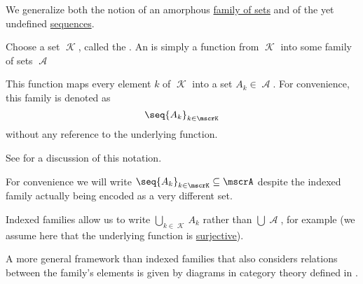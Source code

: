 \begin{definition}\label{def:indexed_family}
  We generalize both the notion of an amorphous \hyperref[rem:family_of_sets]{family of sets} and of the yet undefined \hyperref[def:sequence]{sequences}.

  Choose a set \( \mscrK \), called the . An  is simply a function from \( \mscrK \) into some family of sets \( \mscrA \)

  This function maps every element \( k \) of \( \mscrK \) into a set \( A_k \in \mscrA \). For convenience, this family is denoted as
  \begin{equation*}
    \seq{ A_k }_{k \in \mscrK}
  \end{equation*}
  without any reference to the underlying function.

  See  for a discussion of this notation.

  For convenience we will write \( \seq{ A_k }_{k \in \mscrK} \subseteq \mscrA \) despite the indexed family actually being encoded as a very different set.

  Indexed families allow us to write \( \bigcup_{k \in \mscrK} A_k \) rather than \( \bigcup \mscrA \), for example (we assume here that the underlying function is \hyperref[def:function_invertibility/surjective]{surjective}).

  A more general framework than indexed families that also considers relations between the family's elements is given by diagrams in category theory defined in .
\end{definition}

